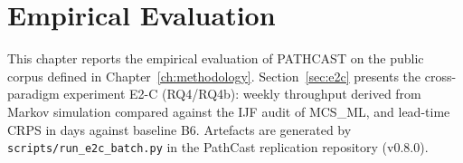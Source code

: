 \chapter{Empirical Evaluation}
\label{ch:evaluation}

This chapter reports the empirical evaluation of PATHCAST on the public corpus
defined in Chapter~\ref{ch:methodology}. Section~\ref{sec:e2c} presents the
cross-paradigm experiment E2-C (RQ4/RQ4b): weekly throughput derived from Markov
simulation compared against the IJF audit of MCS\_ML, and lead-time CRPS in days
against baseline B6. Artefacts are generated by
\texttt{scripts/run\_e2c\_batch.py} in the PathCast replication repository
(v0.8.0).


